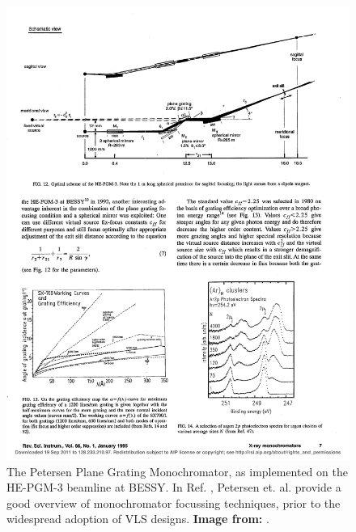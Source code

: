 \begin{figure}[htbp] %
   \centering
  \hspace*{-0.125in} \includegraphics[scale=1]{../data/Chapter1/1c_monoExample/1c_bessy_HE-PGM-3.pdf} 
   \caption{The Petersen Plane Grating Monochromator, as implemented on the HE-PGM-3 beamline at BESSY.  In Ref. \cite{Pet95}, Petersen et. al. provide a good overview of monochromator focussing techniques, prior to the widespread adoption of VLS designs.  \textbf{Image from:} \cite{Pet95}.}
   \label{1c}
\end{figure}

